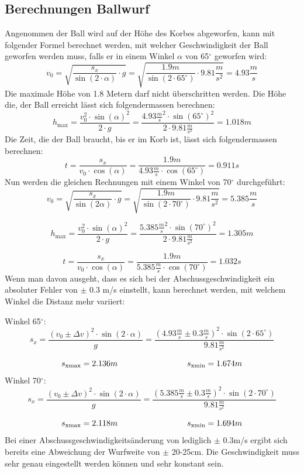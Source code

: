 \subsection{Berechnungen Ballwurf}
Angenommen der Ball wird auf der Höhe des Korbes abgeworfen, kann mit 
folgender Formel berechnet werden, mit welcher Geschwindigkeit der Ball 
geworfen werden muss, falls er in einem Winkel $\alpha$ von 65$^\circ$ 
geworfen wird:
%
\[ v_0 
    = \sqrt{ \frac{s_x}{\sin(2 \cdot \alpha)} \cdot g } 
    = \sqrt{ \frac{1.9m}{\sin(2 \cdot 65^\circ)} \cdot 9.81 \frac{m}{s^2}} 
    = 4.93 \frac{m}{s} \]
%
Die maximale Höhe von 1.8 Metern darf nicht überschritten werden. Die Höhe 
die, der Ball erreicht lässt sich folgendermassen berechnen:
%
\[ h_\text{max} 
    = \frac{v_0^2 \cdot \sin(\alpha)^2}{2 \cdot g} 
    = \frac{4.93 \frac{m}{s}^2 \cdot \sin(65^\circ)^2}{2 \cdot 9.81 \frac{m}{s^2}} 
    = 1.018m \]
%
Die Zeit, die der Ball braucht, bis er im Korb ist, lässt sich folgendermassen 
berechnen:
%
\[ t = \frac{s_x}{v_0 \cdot \cos(\alpha)} 
    = \frac{1.9m}{4.93 \frac{m}{s} \cdot \cos(65^\circ)} = 0.911s \]
%
Nun werden die gleichen Rechnungen mit einem Winkel von 70$^\circ$ durchgeführt:
%
\[ v_0 = \sqrt{ \frac{s_x}{\sin(2\alpha)} \cdot g } 
    = \sqrt{ \frac{1.9m}{\sin(2 \cdot 70^\circ)} \cdot 9.81 \frac{m}{s^2}} 
    = 5.385 \frac{m}{s} \]

\[ h_\text{max} = \frac{v_0^2 \cdot \sin(\alpha)^2}{2 \cdot g} 
    = \frac{5.385 \frac{m}{s}^2 \cdot \sin(70^\circ)^2}{2 \cdot 9.81 \frac{m}{s^2}} 
    = 1.305m \]

\[ t = \frac{s_x}{v_0 \cdot \cos(\alpha)} 
    = \frac{1.9m}{5.385 \frac{m}{s} \cdot \cos(70^\circ)} = 1.032s \]
%
Wenn man davon ausgeht, dass es sich bei der Abschussgeschwindigkeit ein 
absoluter Fehler von $\pm$ 0.3 m/s einstellt, kann berechnet werden, mit 
welchem Winkel die Distanz mehr variiert:

\noindent
Winkel 65$^\circ$:
%
\[ s_x = \frac{(v_0 \pm \Delta v)^2 \cdot \sin(2 \cdot \alpha)}{g} 
    = \frac{(4.93 \frac{m}{s} \pm 0.3 \frac{m}{s})^2 \cdot \sin(2 \cdot 65^\circ)}{9.81 \frac{m}{s^2}} \]

\[ s_\text{xmax} = 2.136m \hspace{30mm} s_\text{xmin} = 1.674m \]
%
Winkel 70$^\circ$:
%
\[ s_x = \frac{(v_0 \pm \Delta v)^2 \cdot \sin(2 \cdot \alpha)}{g} 
    = \frac{(5.385 \frac{m}{s} \pm 0.3 \frac{m}{s})^2 \cdot \sin(2 \cdot 70^\circ)}{9.81 \frac{m}{s^2}} \]

\[ s_\text{xmax} = 2.118m \hspace{30mm} s_\text{xmin} = 1.694m \]
%
Bei einer Abschussgeschwindigkeitsänderung von lediglich $\pm$ 0.3m/s ergibt 
sich bereits eine Abweichung der Wurfweite von $\pm$ 20-25cm. Die 
Geschwindigkeit muss sehr genau eingestellt werden können und sehr konstant sein.

